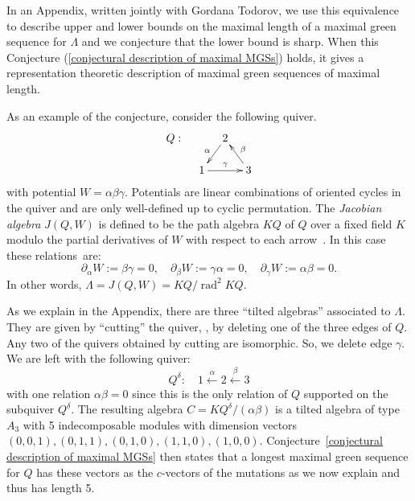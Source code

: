 \documentclass[ALCO,ThmDefs,Unicode,epreuves]{cedram}
\DeclareMathOperator{\rad}{rad}
\begin{document}
In an Appendix, written jointly with Gordana Todorov, we use this equivalence to describe upper and lower bounds on the maximal length of a maximal green sequence for $\Lambda$ and we conjecture that the lower bound is sharp. When this Conjecture (\ref{conjectural description of maximal MGSs}) holds, it gives a representation theoretic description of maximal green sequences of maximal length.

As an example of the conjecture, consider the following quiver.
\[
\xymatrixrowsep{15pt}\xymatrixcolsep{10pt}
\xymatrix{%
Q:&& 2\ar[dl]_\alpha\\
&1\ar[rr]^\gamma &&3\ar[lu]_\beta
	}%
\]
with potential $W=\alpha\beta\gamma$. Potentials are linear combinations of oriented cycles in the quiver and are only well-defined up to cyclic permutation. The \emph{Jacobian algebra} $J(Q,W)$ is defined to be the path algebra $KQ$ of $Q$ over a fixed field $K$ modulo the partial derivatives of $W$ with respect to each arrow~\cite{DWZ1}. In this case these relations~are:
\[
	\partial_\alpha W:=\beta\gamma=0,\quad \partial_\beta W:=\gamma\alpha=0,\quad \partial_\gamma W:=\alpha\beta=0.
\]
In other words, $\Lambda=J(Q,W)=KQ/\rad ^2KQ$. 

As we explain in the Appendix, there are three ``tilted algebras'' associated to $\Lambda$. They are given by ``cutting'' the quiver, \ie, by deleting one of the three edges of $Q$. Any two of the quivers obtained by cutting are isomorphic. So, we delete edge $\gamma$. We are left with the following quiver:
\[
	Q^\delta:\quad 1\xleftarrow\alpha 2\xleftarrow\beta 3
\]
with one relation $\alpha\beta=0$ since this is the only relation of $Q$ supported on the subquiver $Q^\delta$. The resulting algebra $C=KQ^\delta/(\alpha\beta)$ is a tilted algebra of type $A_3$ with 5 indecomposable modules with dimension vectors $(0,0,1), (0,1,1), (0,1,0), (1,1,0), (1,0,0)$. Conjecture~\ref{conjectural description of maximal MGSs} then states that a longest maximal green sequence for $Q$ has these vectors as the $c$-vectors of the mutations as we now explain and thus has length 5.
\end{document}
